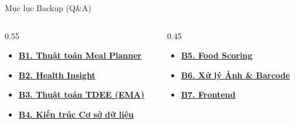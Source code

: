 \documentclass[10pt, aspectratio=169]{beamer}
\begin{document}
\begin{frame}[label=backup_toc_master]{Mục lục Backup (Q\&A)}
\hypertarget{backup_toc_target}{}
    \vspace{0.5cm}
    \begin{columns}[T]
        \begin{column}{0.55\textwidth}
            \begin{itemize}
                \setlength\itemsep{0.6cm}
                \Large
                \item[\textcolor{NutriDark}{$\blacktriangleright$}] \hyperlink{subtoc_b1_target}{\textbf{B1. Thuật toán Meal Planner}}
                \item[\textcolor{NutriDark}{$\blacktriangleright$}] \hyperlink{subtoc_b2_target}{\textbf{B2. Health Insight}}
                \item[\textcolor{NutriDark}{$\blacktriangleright$}] \hyperlink{subtoc_b3_target}{\textbf{B3. Thuật toán TDEE (EMA)}}
                \item[\textcolor{NutriDark}{$\blacktriangleright$}] \hyperlink{subtoc_b4_target}{\textbf{B4. Kiến trúc Cơ sở dữ liệu}}
            \end{itemize}
        \end{column}
        \begin{column}{0.45\textwidth}
            \begin{itemize}
                \setlength\itemsep{0.6cm}
                \Large
                \item[\textcolor{NutriDark}{$\blacktriangleright$}] \hyperlink{subtoc_b5_target}{\textbf{B5. Food Scoring}}
                \item[\textcolor{NutriDark}{$\blacktriangleright$}] \hyperlink{subtoc_b6_target}{\textbf{B6. Xử lý Ảnh \& Barcode}}
                \item[\textcolor{NutriDark}{$\blacktriangleright$}] \hyperlink{subtoc_b7_target}{\textbf{B7. Frontend}}
            \end{itemize}
        \end{column}
    \end{columns}
\end{frame}

\end{document}
